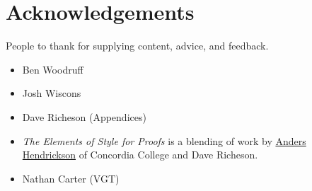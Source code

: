 \chapter*{Acknowledgements}

People to thank for supplying content, advice, and feedback.
\begin{itemize}
\item Ben Woodruff
\item Josh Wiscons
\item Dave Richeson (Appendices)
\item \emph{The Elements of Style for Proofs} is a blending of work by \href{http://www.cord.edu/faculty/ahendric/}{Anders Hendrickson} of Concordia College and Dave Richeson.
\item Nathan Carter (VGT)
\end{itemize}